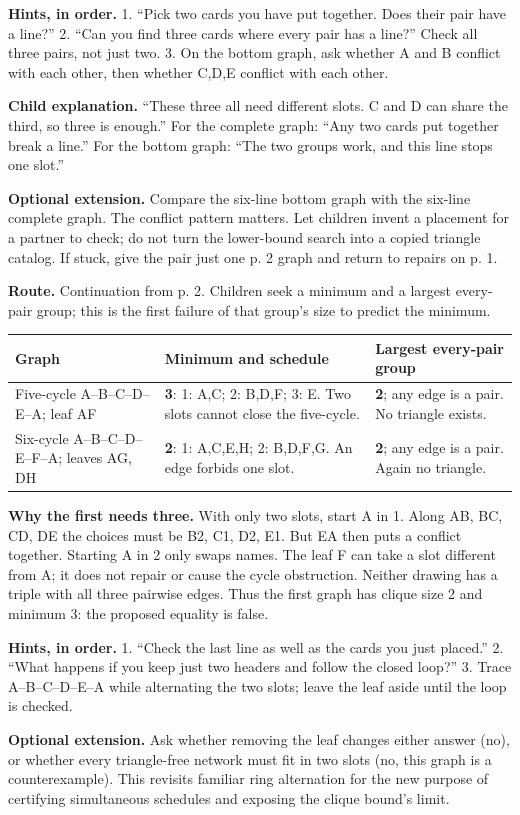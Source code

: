 \documentclass[10pt,letterpaper]{article}
\newcommand{\topic}[1]{\vspace{3pt}{\large\bfseries #1}\par}
\newcommand{\labelled}[2]{\textbf{#1} #2\par}
\newcommand{\hint}[1]{\textbf{Hints, in order.} #1\par}
\newcommand{\route}[1]{\textbf{Route.} #1\par}
\begin{document}
\hint{1. ``Pick two cards you have put together. Does their pair have a line?'' 2. ``Can you find three cards where every pair has a line?'' Check all three pairs, not just two. 3. On the bottom graph, ask whether A and B conflict with each other, then whether C,D,E conflict with each other.}
\labelled{Child explanation.}{``These three all need different slots. C and D can share the third, so three is enough.'' For the complete graph: ``Any two cards put together break a line.'' For the bottom graph: ``The two groups work, and this line stops one slot.''}
\labelled{Optional extension.}{Compare the six-line bottom graph with the six-line complete graph. The conflict pattern matters. Let children invent a placement for a partner to check; do not turn the lower-bound search into a copied triangle catalog. If stuck, give the pair just one p. 2 graph and return to repairs on p. 1.}
\newpage
\topic{Student p. 3 / Problem 3: a clique can miss the obstruction}
\route{Continuation from p. 2. Children seek a minimum and a largest every-pair group; this is the first failure of that group's size to predict the minimum.}
\begin{tabularx}{\linewidth}{@{}p{1.12in}Xp{1.35in}@{}}
\toprule
Graph & Minimum and schedule & Largest every-pair group \\
\midrule
Five-cycle A--B--C--D--E--A; leaf AF & \textbf{3}: 1: A,C; 2: B,D,F; 3: E. Two slots cannot close the five-cycle. & \textbf{2}; any edge is a pair. No triangle exists. \\
Six-cycle A--B--C--D--E--F--A; leaves AG, DH & \textbf{2}: 1: A,C,E,H; 2: B,D,F,G. An edge forbids one slot. & \textbf{2}; any edge is a pair. Again no triangle. \\
\bottomrule
\end{tabularx}\par\smallskip
\labelled{Why the first needs three.}{With only two slots, start A in 1. Along AB, BC, CD, DE the choices must be B2, C1, D2, E1. But EA then puts a conflict together. Starting A in 2 only swaps names. The leaf F can take a slot different from A; it does not repair or cause the cycle obstruction. Neither drawing has a triple with all three pairwise edges. Thus the first graph has clique size 2 and minimum 3: the proposed equality is false.}
\hint{1. ``Check the last line as well as the cards you just placed.'' 2. ``What happens if you keep just two headers and follow the closed loop?'' 3. Trace A--B--C--D--E--A while alternating the two slots; leave the leaf aside until the loop is checked.}
\labelled{Optional extension.}{Ask whether removing the leaf changes either answer (no), or whether every triangle-free network must fit in two slots (no, this graph is a counterexample). This revisits familiar ring alternation for the new purpose of certifying simultaneous schedules and exposing the clique bound's limit.}
\end{document}
